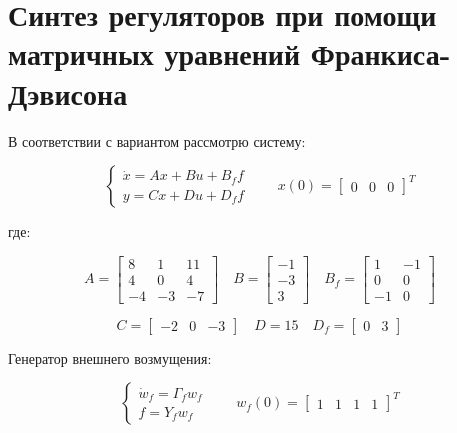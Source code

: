 \documentclass[a4paper,12pt]{article}
\begin{document}
	\newpage
	\tableofcontents
	
	\newpage \section{Синтез регуляторов при помощи матричных уравнений Франкиса-Дэвисона}\label{sec:1}
	
	В соответствии с вариантом рассмотрю систему:
	
\begin{equation}
	\begin{cases}
		\dot{x} = Ax + Bu + B_f f \\
		y = Cx + Du + D_f f
	\end{cases}
	\qquad
	x(0) = \begin{bmatrix} 0 & 0 & 0 \end{bmatrix}^T
		\label{sys}
\end{equation}
	
	где:
	
	\[
	A = \begin{bmatrix} 
		8 & 1 & 11 \\ 
		4 & 0 & 4 \\ 
		-4 & -3 & -7 
	\end{bmatrix} \quad
	B = \begin{bmatrix} -1 \\ -3 \\ 3 \end{bmatrix} \quad
	B_f = \begin{bmatrix} 
		1 & -1 \\ 
		0 & 0 \\ 
		-1 & 0
	\end{bmatrix}
	\]
	
	\[
	C = \begin{bmatrix} -2 & 0 & -3 \end{bmatrix} \quad
	D = 15 \quad
	D_f = \begin{bmatrix} 0 & 3 \end{bmatrix}
	\]
	
	Генератор внешнего возмущения:
	
\begin{equation}
	\begin{cases}
		\dot{w}_f = \Gamma_f w_f \\
		f = Y_f w_f
	\end{cases}
	\qquad
	w_f(0) = \begin{bmatrix} 1 & 1 & 1 & 1 \end{bmatrix}^T
		\label{genF}
\end{equation}
	
\end{document}
